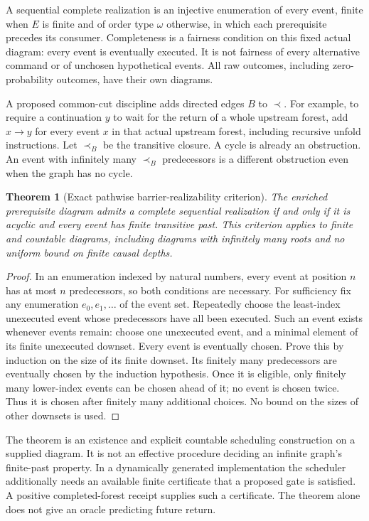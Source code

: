 \documentclass{article}
\newtheorem{theorem}{Theorem}
\begin{document}
A sequential complete realization is an injective enumeration of every event, finite when $E$ is finite and of order type $\omega$ otherwise, in which each prerequisite precedes its consumer. Completeness is a fairness condition on this fixed actual diagram: every event is eventually executed. It is not fairness of every alternative command or of unchosen hypothetical events. All raw outcomes, including zero-probability outcomes, have their own diagrams.

A proposed common-cut discipline adds directed edges $B$ to $\prec$. For example, to require a continuation $y$ to wait for the return of a whole upstream forest, add $x\to y$ for every event $x$ in that actual upstream forest, including recursive unfold instructions. Let $\prec_B$ be the transitive closure. A cycle is already an obstruction. An event with infinitely many $\prec_B$ predecessors is a different obstruction even when the graph has no cycle.

\begin{theorem}[Exact pathwise barrier-realizability criterion]\label{thm:criterion}
The enriched prerequisite diagram admits a complete sequential realization if and only if it is acyclic and every event has finite transitive past. This criterion applies to finite and countable diagrams, including diagrams with infinitely many roots and no uniform bound on finite causal depths.
\end{theorem}
\begin{proof}
In an enumeration indexed by natural numbers, every event at position $n$ has at most $n$ predecessors, so both conditions are necessary. For sufficiency fix any enumeration $e_0,e_1,\ldots$ of the event set. Repeatedly choose the least-index unexecuted event whose predecessors have all been executed. Such an event exists whenever events remain: choose one unexecuted event, and a minimal element of its finite unexecuted downset. Every event is eventually chosen. Prove this by induction on the size of its finite downset. Its finitely many predecessors are eventually chosen by the induction hypothesis. Once it is eligible, only finitely many lower-index events can be chosen ahead of it; no event is chosen twice. Thus it is chosen after finitely many additional choices. No bound on the sizes of other downsets is used.
\end{proof}

The theorem is an existence and explicit countable scheduling construction on a supplied diagram. It is not an effective procedure deciding an infinite graph's finite-past property. In a dynamically generated implementation the scheduler additionally needs an available finite certificate that a proposed gate is satisfied. A positive completed-forest receipt supplies such a certificate. The theorem alone does not give an oracle predicting future return.
\end{document}

